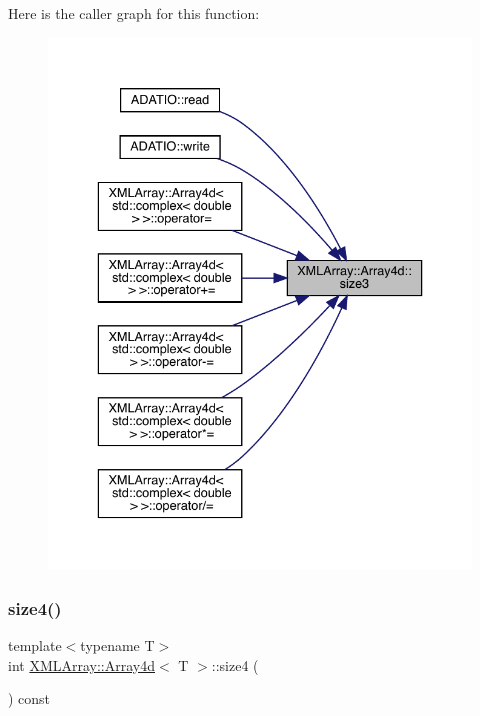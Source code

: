 Here is the caller graph for this function\+:
\nopagebreak
\begin{figure}[H]
\begin{center}
\leavevmode
\includegraphics[width=336pt]{de/d16/classXMLArray_1_1Array4d_ae9c6211389f5a1fd2bc756bb5e7b53b1_icgraph}
\end{center}
\end{figure}
\mbox{\label{classXMLArray_1_1Array4d_abcaa3187b7b1b4b36997937c7597f393}} 
\subsubsection{\texorpdfstring{size4()}{size4()}\hspace{0.1cm}{\footnotesize\ttfamily [1/3]}}
{\footnotesize\ttfamily template$<$typename T$>$ \\
int \mbox{\hyperlink{classXMLArray_1_1Array4d}{X\+M\+L\+Array\+::\+Array4d}}$<$ T $>$\+::size4 (\begin{DoxyParamCaption}{ }\end{DoxyParamCaption}) const\hspace{0.3cm}{\ttfamily [inline]}}

